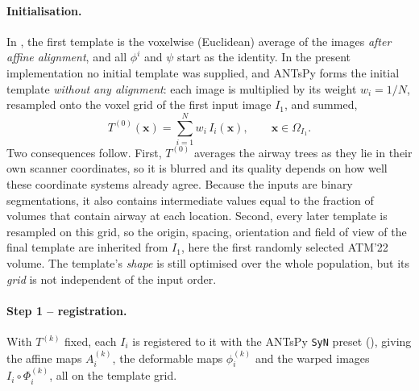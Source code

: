 \paragraph{Initialisation.}  %
In \citet{avants2010sygn}, the first template is the voxelwise (Euclidean)
average of the images \emph{after affine alignment}, and all $\phi^i$ and $\psi$
start as the identity. In the present implementation no initial template was
supplied, and ANTsPy forms the initial template \emph{without any alignment}: each
image is multiplied by its weight $w_i = 1/N$, resampled onto the voxel grid of
the first input image $I_1$, and summed,
\begin{equation}
  T^{(0)}(\mathbf{x}) = \sum_{i=1}^{N} w_i\, I_i(\mathbf{x}),
  \qquad \mathbf{x}\in\Omega_{I_1}.
  \label{eq:initial_template}    %
\end{equation}
Two consequences follow. First, $T^{(0)}$ averages the airway trees as they lie
in their own scanner coordinates, so it is blurred and its quality depends on how
well these coordinate systems already agree. Because the inputs are binary
segmentations, it also contains intermediate values equal to the fraction of
volumes that contain airway at each location. Second, every later template is
resampled on this grid, so the origin, spacing, orientation and field of view of
the final template are inherited from $I_1$, here the first randomly selected
ATM'22 volume. The template's \emph{shape} is still optimised over the whole
population, but its \emph{grid} is not independent of the input order.

\paragraph{Step 1 -- registration.}  %
With $T^{(k)}$ fixed, each $I_i$ is registered to it with the ANTsPy \texttt{SyN}
preset (), giving the affine maps $A_i^{(k)}$, the
deformable maps $\phi_i^{(k)}$ and the warped images
$I_i\circ\Phi_i^{(k)}$, all on the template grid.

